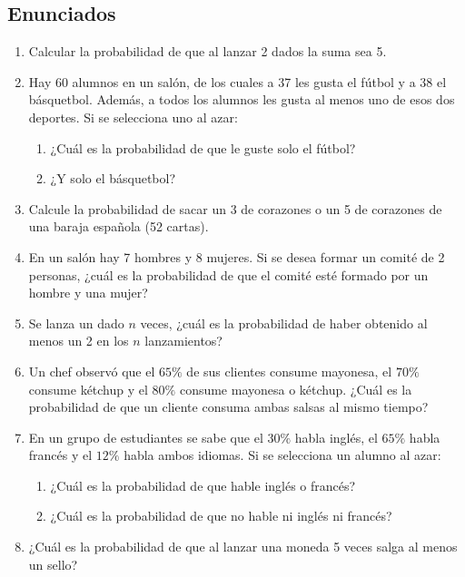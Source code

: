 \documentclass[12pt, letterpaper]{article}
\begin{document}
\subsection{Enunciados}
\begin{enumerate}
	\item Calcular la probabilidad de que al lanzar 2 dados la suma sea 5.
	\item Hay 60 alumnos en un salón, de los cuales a 37 les gusta el fútbol y a 38 el básquetbol. Además, a todos los alumnos les gusta al menos uno de esos dos deportes. Si se selecciona uno al azar:
	      \begin{enumerate}
		      \item ¿Cuál es la probabilidad de que le guste solo el fútbol?
		      \item ¿Y solo el básquetbol?
	      \end{enumerate}
	\item Calcule la probabilidad de sacar un 3 de corazones o un 5 de corazones de una baraja española (52 cartas).
	\item En un salón hay 7 hombres y 8 mujeres. Si se desea formar un comité de 2 personas, ¿cuál es la probabilidad de que el comité esté formado por un hombre y una mujer?
	\item Se lanza un dado $n$ veces, ¿cuál es la probabilidad de haber obtenido al menos un 2 en los $n$ lanzamientos?
	\item Un chef observó que el $65\%$ de sus clientes consume mayonesa, el $70\%$ consume kétchup y el $80\%$ consume mayonesa o kétchup. ¿Cuál es la probabilidad de que un cliente consuma ambas salsas al mismo tiempo?
	\item En un grupo de estudiantes se sabe que el $30\%$ habla inglés, el $65\%$ habla francés y el $12\%$ habla ambos idiomas. Si se selecciona un alumno al azar:
	      \begin{enumerate}
		      \item ¿Cuál es la probabilidad de que hable inglés o francés?
		      \item ¿Cuál es la probabilidad de que no hable ni inglés ni francés?
	      \end{enumerate}
	\item ¿Cuál es la probabilidad de que al lanzar una moneda 5 veces salga al menos un sello?
\end{enumerate}
\end{document}
